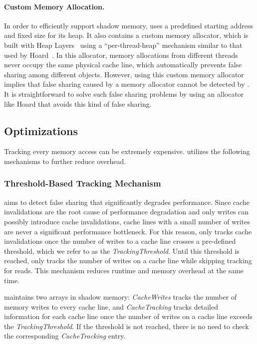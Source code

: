 \paragraph{Custom Memory Allocation.} In order to efficiently support shadow memory, \Predator{} uses a predefined starting address and fixed size for its heap.  It also contains a custom memory allocator, which is built with Heap Layers~\cite{heaplayers} using a ``per-thread-heap'' mechanism similar to that used by Hoard~\cite{Hoard}.  In this allocator, memory allocations from different threads never occupy the same physical cache line, which automatically prevents false sharing among different objects.  However, using this custom memory allocator implies that false sharing caused by a memory allocator cannot be detected by \Predator{}. It is straightforward to solve such false sharing problems by using an allocator like Hoard that avoids this kind of false sharing.

 
\subsection{Optimizations}
\label{optimization}
Tracking every memory access can be extremely expensive.  
\Predator{} utilizes the following mechanisms to further reduce overhead.

\subsubsection{Threshold-Based Tracking Mechanism}
\label{sec:thresholdtracking}
\Predator{} aims to detect false sharing that significantly degrades performance. Since cache invalidations are the root cause of performance degradation and only writes 
can possibly introduce cache invalidations, 
cache lines with a small number of writes are never a significant performance bottleneck.
For this reason, \Predator{} only tracks cache invalidations
once the number of writes to a cache line crosses a
pre-defined threshold, which we refer to as the {\it TrackingThreshold}. 
Until this threshold is reached, \Predator{} only tracks the number of writes on a cache line 
while skipping tracking for reads.
This mechanism reduces runtime and memory overhead
at the same time.

\Predator{} maintains two arrays in shadow memory: 
{\it CacheWrites} tracks the number of memory writes to every cache line, and
{\it CacheTracking} tracks detailed information 
for each cache line once the number of writes on a cache line exceeds
the {\it TrackingThreshold}. 
If the threshold is not reached, there is no need to check the corresponding {\it CacheTracking} entry. 

